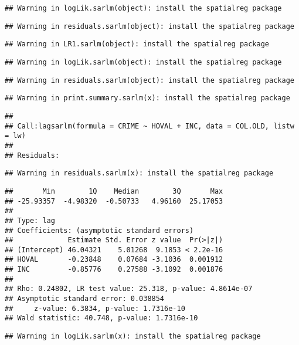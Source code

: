 \documentclass[
]{article}
\begin{document}
\begin{verbatim}
## Warning in logLik.sarlm(object): install the spatialreg package
\end{verbatim}

\begin{verbatim}
## Warning in residuals.sarlm(object): install the spatialreg package
\end{verbatim}

\begin{verbatim}
## Warning in LR1.sarlm(object): install the spatialreg package
\end{verbatim}

\begin{verbatim}
## Warning in logLik.sarlm(object): install the spatialreg package
\end{verbatim}

\begin{verbatim}
## Warning in residuals.sarlm(object): install the spatialreg package
\end{verbatim}

\begin{verbatim}
## Warning in print.summary.sarlm(x): install the spatialreg package
\end{verbatim}

\begin{verbatim}
## 
## Call:lagsarlm(formula = CRIME ~ HOVAL + INC, data = COL.OLD, listw = lw)
## 
## Residuals:
\end{verbatim}

\begin{verbatim}
## Warning in residuals.sarlm(x): install the spatialreg package
\end{verbatim}

\begin{verbatim}
##       Min        1Q    Median        3Q       Max 
## -25.93357  -4.98320  -0.50733   4.96160  25.17053 
## 
## Type: lag 
## Coefficients: (asymptotic standard errors) 
##             Estimate Std. Error z value  Pr(>|z|)
## (Intercept) 46.04321    5.01268  9.1853 < 2.2e-16
## HOVAL       -0.23848    0.07684 -3.1036  0.001912
## INC         -0.85776    0.27588 -3.1092  0.001876
## 
## Rho: 0.24802, LR test value: 25.318, p-value: 4.8614e-07
## Asymptotic standard error: 0.038854
##     z-value: 6.3834, p-value: 1.7316e-10
## Wald statistic: 40.748, p-value: 1.7316e-10
\end{verbatim}

\begin{verbatim}
## Warning in logLik.sarlm(x): install the spatialreg package
\end{verbatim}
\end{document}

